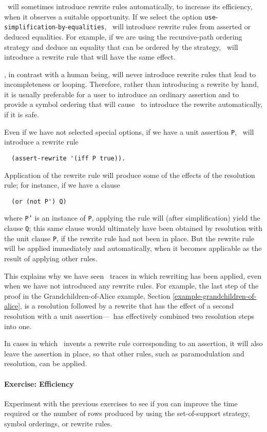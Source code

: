 \Snark\  will sometimes introduce rewrite rules automatically, to increase its
efficiency, when it observes a suitable opportunity.  If we select the option
{\tt use}-{\tt simplification}-{\tt by}-{\tt equalities}, \Snark\  will
introduce rewrite rules from asserted or deduced equalities.  For example, if
we are using the recursive-path ordering strategy and deduce an equality
that can be ordered by the strategy, \snark\  will introduce a rewrite rule
that will have the same effect.

 \Snark\/, in contrast with a human being, will never introduce rewrite rules
that lead to incompleteness or looping.  Therefore, rather than introducing a
rewrite by hand, it is usually preferable for a user to introduce an ordinary
assertion and to provide a symbol ordering that will cause \snark\  to
introduce the rewrite automatically, if it is safe.

Even if we have not selected special options, if we have a unit assertion
\verb'P', \snark\  will introduce a rewrite rule
\begin{verbatim}
  (assert-rewrite '(iff P true)).
\end{verbatim}
  Application of the rewrite rule will produce
some of the effects of the resolution rule; for instance, if we have a clause
\begin{verbatim}
  (or (not P') Q)
\end{verbatim}
where {\tt P'} is an instance of {\tt P}, applying the rule will (after
simplification) yield the clause \verb'Q'; this same clause would ultimately
have been obtained by resolution with the unit clause \verb'P', if the
rewrite rule had not been in place.  But the rewrite rule will be applied
immediately and automatically, when it becomes applicable as the result of
applying other rules.

This explains why we have seen \snark\  traces in which rewriting has been
applied, even when we have not introduced any rewrite rules.  For example,
the last step of the proof in the Grandchildren-of-Alice example, Section
\ref{example-grandchildren-of-alice}, is a resolution followed by a rewrite
that has the effect of a second resolution with a unit assertion---\snark\
has effectively combined two resolution steps into one.

In cases in which \snark\  invents a rewrite rule corresponding to an assertion, it will also
leave the assertion in place, so that other rules, such as paramodulation and
resolution, can be applied.

\paragraph{Exercise: Efficiency}
\label{exec-efficiency}
Experiment with the previous exercises to see if you can improve the
time required or the number of rows produced by using the
set-of-support strategy, symbol orderings, or rewrite rules.

